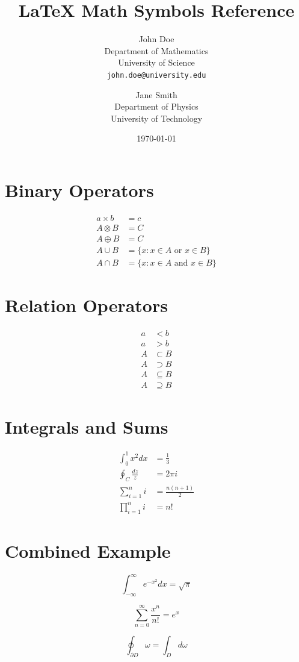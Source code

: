 \documentclass{article}
\title{\Large LaTeX Math Symbols Reference}
\author{
	John Doe \\
	Department of Mathematics \\
	University of Science \\
	\texttt{john.doe@university.edu}
	\and
	Jane Smith \\
	Department of Physics \\
	University of Technology
}
\date{\today}
\begin{document}
	
	\maketitle
	
	\section{Binary Operators}
	\begin{align*}
		a \times b &= c \\
		A \otimes B &= C \\
		A \oplus B &= C \\
		A \cup B &= \{x : x \in A \text{ or } x \in B\} \\
		A \cap B &= \{x : x \in A \text{ and } x \in B\}
	\end{align*}
	
	\section{Relation Operators}
	\begin{align*}
		a &< b \\
		a &> b \\
		A &\subset B \\
		A &\supset B \\
		A &\subseteq B \\
		A &\supseteq B
	\end{align*}
	
	\section{Integrals and Sums}
	\begin{align*}
		\int_0^1 x^2 dx &= \frac{1}{3} \\
		\oint_C \frac{dz}{z} &= 2\pi i \\
		\sum_{i=1}^n i &= \frac{n(n+1)}{2} \\
		\prod_{i=1}^n i &= n!
	\end{align*}
	
	\section{Combined Example}
	\[
	\int_{-\infty}^{\infty} e^{-x^2} dx = \sqrt{\pi}
	\]
	
	\[
	\sum_{n=0}^{\infty} \frac{x^n}{n!} = e^x
	\]
	
	\[
	\oint_{\partial D} \omega = \int_D d\omega
	\]
	
\end{document}
